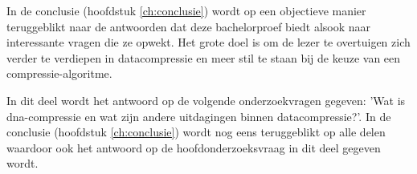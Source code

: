 In de conclusie (hoofdstuk \ref{ch:conclusie}) wordt op een objectieve manier teruggeblikt naar de antwoorden dat deze bachelorproef biedt alsook naar interessante vragen die ze opwekt. Het grote doel is om de lezer te overtuigen zich verder te verdiepen in \gls{datacompressie} en meer stil te staan bij de keuze van een \gls{compressie-algoritme}.

In dit deel wordt het antwoord op de volgende onderzoekvragen gegeven: 'Wat is \gls{dna-compressie} en wat zijn andere uitdagingen binnen \gls{datacompressie}?'. In de conclusie (hoofdstuk \ref{ch:conclusie}) wordt nog eens teruggeblikt op alle delen waardoor ook het antwoord op de hoofdonderzoeksvraag in dit deel gegeven wordt.